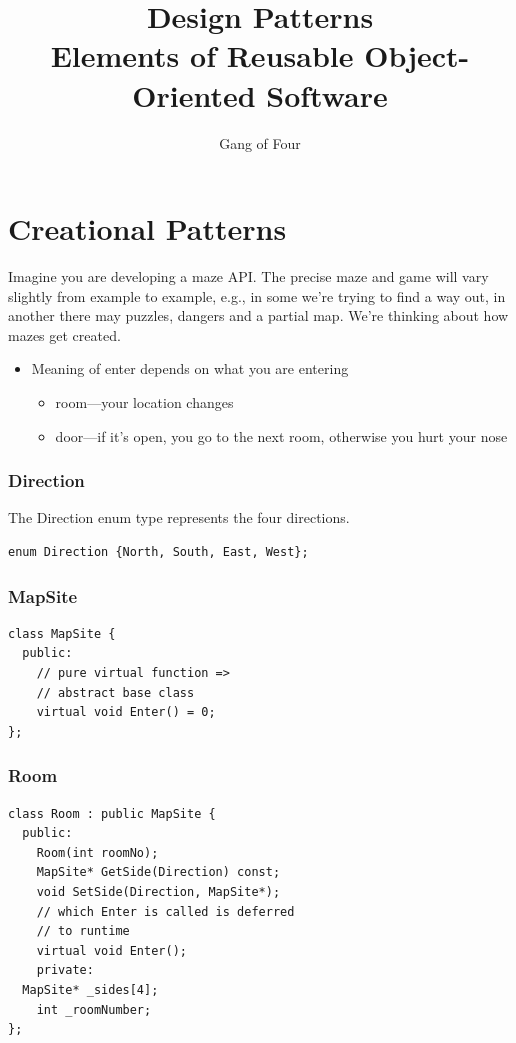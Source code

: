 \documentclass[11pt]{report}
\title{\bf {\Huge Design Patterns}\\
\huge Elements of Reusable Object-Oriented Software}
\author{Gang of Four}
\date{}
\begin{document}
\maketitle

\chapter{Creational Patterns}
Imagine you are developing a maze API. The precise maze and game will vary
slightly from example to example, e.g., in some we're trying to find a way
out, in another there may puzzles, dangers and a partial map.
We're thinking about how mazes get created. 

\begin{itemize}
\item Meaning of enter depends on what you are entering
\begin{itemize}
\item room---your location changes
\item door---if it's open, you go to the next room, otherwise you hurt your nose
\end{itemize}
\end{itemize}

\subsection*{Direction}
The Direction enum
type represents the four directions.
\begin{lstlisting}
enum Direction {North, South, East, West};
\end{lstlisting}

\subsection*{MapSite}

\begin{lstlisting}
class MapSite {
  public:
    // pure virtual function =>
    // abstract base class
    virtual void Enter() = 0;
};
\end{lstlisting}

\subsection*{Room}

\begin{lstlisting}
class Room : public MapSite {
  public:
    Room(int roomNo);
    MapSite* GetSide(Direction) const;
    void SetSide(Direction, MapSite*);
    // which Enter is called is deferred
    // to runtime
    virtual void Enter();
    private:
  MapSite* _sides[4];
    int _roomNumber;
};
\end{lstlisting}
\end{document}
